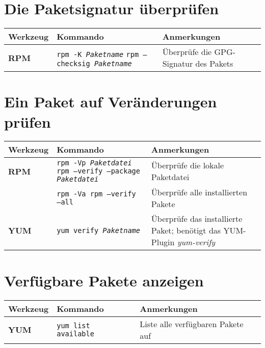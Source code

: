 \documentclass[10pt,a4paper]{article}
\begin{document}
\section{Die Paketsignatur überprüfen}
\begin{tabular}{ p{3.5cm} p{9cm} p{11cm}}
  \hline
  \rowcolor{Gray}
  \textbf{Werkzeug} & \textbf{Kommando} & \textbf{Anmerkungen} \\
  \hline 
  \textbf{RPM} & \texttt{rpm -K \textit{Paketname}} \newline \texttt{rpm --checksig \textit{Paketname}} & Überprüfe die GPG-Signatur des Pakets \\
  \hline
\end{tabular}

\section{Ein Paket auf Veränderungen prüfen}
\begin{tabular}{ p{3.5cm} p{9cm} p{11cm}}
  \hline
  \rowcolor{Gray}
  \textbf{Werkzeug} & \textbf{Kommando} & \textbf{Anmerkungen} \\
  \hline 
  \textbf{RPM} & \texttt{rpm -Vp \textit{Paketdatei}} \newline \texttt{rpm --verify --package \textit{Paketdatei}} & Überprüfe die lokale Paketdatei\\
  \rowcolor{Gray}
  & \texttt{rpm -Va \newline \texttt{rpm --verify --all }} & Überprüfe alle installierten Pakete \\
  \textbf{YUM} & \texttt{yum verify \textit{Paketname}} & Überprüfe das installierte Paket; benötigt das YUM-Plugin \textit{yum-verify} \\
  \hline
\end{tabular}

\newpage

\cheatsheet

\section{Verfügbare Pakete anzeigen}
\begin{tabular}{ p{3.5cm} p{9cm} p{11cm}}
  \hline
  \rowcolor{Gray}
  \textbf{Werkzeug} & \textbf{Kommando} & \textbf{Anmerkungen} \\
  \hline 
  \textbf{YUM} & \texttt{yum list available} & Liste alle verfügbaren Pakete auf \\
  \hline
\end{tabular}
\end{document}

